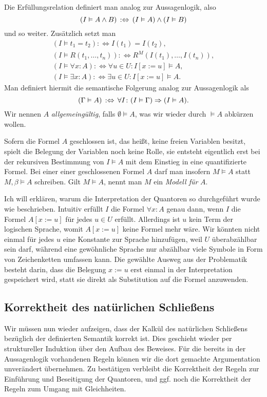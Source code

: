 Die Erfüllungsrelation definiert man analog zur Aussagenlogik, also
\[(I\vDash A\land B)\,:\Leftrightarrow\,(I\vDash A)\land (I\vDash B)\]
und so weiter. Zusätzlich setzt man%
\begin{gather*}
(I\models t_1 = t_2) :\Leftrightarrow I(t_1) = I(t_2),\\
(I\models R(t_1,\ldots,t_n)):\Leftrightarrow R^M(I(t_1),\ldots,I(t_n)),\\
(I\models\forall x\colon A) :\Leftrightarrow\forall u\in U\colon I[x{:=}u]\models A,\\
(I\models\exists x\colon A) :\Leftrightarrow\exists u\in U\colon I[x{:=}u]\models A.
\end{gather*}
Man definiert hiermit die semantische Folgerung analog zur Aussagenlogik als
\[(\Gamma\vDash A)\,:\Leftrightarrow\,\forall I\colon (I\vDash\Gamma)\Rightarrow (I\vDash A).\]
Wir nennen $A$ \emph{allgemeingültig}, falls $\emptyset\models A$, was
wir wieder durch $\models A$ abkürzen wollen.

Sofern die Formel $A$ geschlossen ist, das heißt, keine freien
Variablen besitzt, spielt die Belegung der Variablen noch keine Rolle, sie
entsteht eigentlich erst bei der rekursiven Bestimmung von $I\models A$
mit dem Einstieg in eine quantifizierte Formel. Bei einer einer
geschlossenen Formel $A$ darf man insofern $M\models A$ statt
$M,\beta\models A$ schreiben. Gilt $M\models A$, nennt man $M$ ein
\emph{Modell für} $A$.

Ich will erklären, warum die Interpretation der Quantoren so durchgeführt
wurde wie beschrieben. Intuitiv erfüllt $I$ die Formel
$\forall x\colon A$ genau dann, wenn $I$ die Formel $A[x:=u]$ für jedes
$u\in U$ erfüllt. Allerdings ist $u$ kein Term der logischen Sprache,
womit $A[x:=u]$ keine Formel mehr wäre. Wir könnten nicht einmal für
jedes $u$ eine Konstante zur Sprache hinzufügen, weil $U$ überabzählbar
sein darf, während eine gewöhnliche Sprache nur abzählbar viele
Symbole in Form von Zeichenketten umfassen kann. Die gewählte Ausweg
aus der Problematik besteht darin, dass die Belegung $x:=u$ erst einmal
in der Interpretation gespeichert wird, statt sie direkt
als Substitution auf die Formel anzuwenden.

\subsection{Korrektheit des natürlichen Schließens}

Wir müssen nun wieder aufzeigen, dass der Kalkül des natürlichen
Schließens bezüglich der definierten Semantik korrekt ist. Dies
geschieht wieder per struktureller Induktion über den Aufbau des
Beweises. Für die bereits in der Aussagenlogik vorhandenen Regeln
können wir die dort gemachte Argumentation unverändert übernehmen.
Zu bestätigen verbleibt die Korrektheit der Regeln zur Einführung und
Beseitigung der Quantoren, und ggf. noch die Korrektheit der Regeln zum
Umgang mit Gleichheiten.

